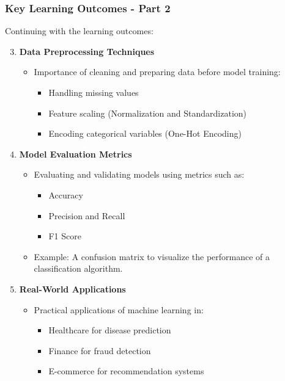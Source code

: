 \documentclass[aspectratio=169]{beamer}
\begin{document}
\begin{frame}[fragile]
    \frametitle{Key Learning Outcomes - Part 2}
    Continuing with the learning outcomes:
    
    \begin{enumerate}
        \setcounter{enumi}{2} %
        \item \textbf{Data Preprocessing Techniques}
        \begin{itemize}
            \item Importance of cleaning and preparing data before model training:
                \begin{itemize}
                    \item Handling missing values
                    \item Feature scaling (Normalization and Standardization)
                    \item Encoding categorical variables (One-Hot Encoding)
                \end{itemize}
        \end{itemize}

        \item \textbf{Model Evaluation Metrics}
        \begin{itemize}
            \item Evaluating and validating models using metrics such as:
                \begin{itemize}
                    \item Accuracy
                    \item Precision and Recall
                    \item F1 Score
                \end{itemize}
            \item Example: A confusion matrix to visualize the performance of a classification algorithm.
        \end{itemize}
        
        \item \textbf{Real-World Applications}
        \begin{itemize}
            \item Practical applications of machine learning in:
                \begin{itemize}
                    \item Healthcare for disease prediction
                    \item Finance for fraud detection
                    \item E-commerce for recommendation systems
                \end{itemize}
        \end{itemize}
    \end{enumerate}
\end{frame}
\end{document}
